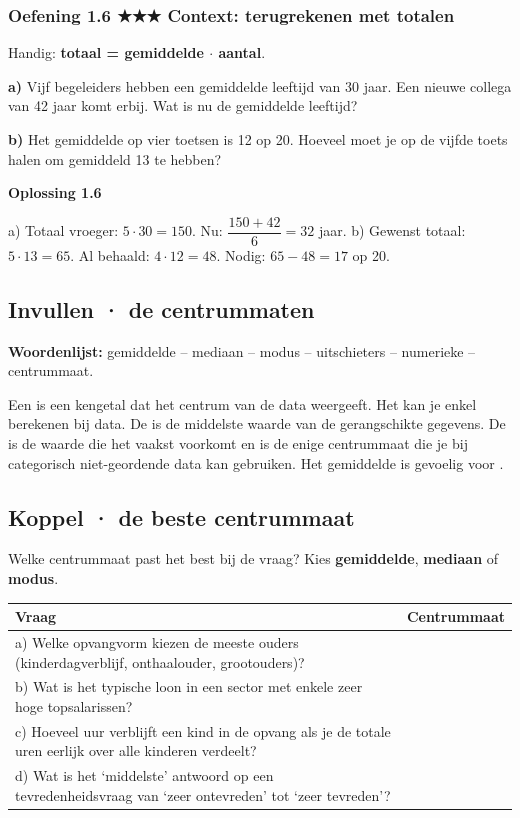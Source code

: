 \subsubsection*{Oefening 1.6 \quad ★★★ \quad Context: terugrekenen met totalen}

Handig: \textbf{totaal = gemiddelde $\cdot$ aantal}.

\textbf{a)} Vijf begeleiders hebben een gemiddelde leeftijd van 30 jaar. Een nieuwe collega van 42 jaar komt erbij. Wat is nu de gemiddelde leeftijd? \lijn

\textbf{b)} Het gemiddelde op vier toetsen is 12 op 20. Hoeveel moet je op de vijfde toets halen om gemiddeld 13 te hebben? \lijn

\begin{oplossing}
\textbf{Oplossing 1.6}

a) Totaal vroeger: $5\cdot 30=150$. Nu: $\dfrac{150+42}{6}=32$ jaar. b) Gewenst totaal: $5\cdot 13=65$. Al behaald: $4\cdot 12=48$. Nodig: $65-48=17$ op 20.
\end{oplossing}

\subsection*{Invullen · de centrummaten}

\textbf{Woordenlijst:} gemiddelde – mediaan – modus – uitschieters – numerieke – centrummaat.

Een  is een kengetal dat het centrum van de data weergeeft. Het  kan je enkel berekenen bij  data. De  is de middelste waarde van de gerangschikte gegevens. De  is de waarde die het vaakst voorkomt en is de enige centrummaat die je bij categorisch niet-geordende data kan gebruiken. Het gemiddelde is gevoelig voor .

\subsection*{Koppel · de beste centrummaat}

Welke centrummaat past het best bij de vraag? Kies \textbf{gemiddelde}, \textbf{mediaan} of \textbf{modus}.

\begin{tabular}{ll}
\hline
Vraag & Centrummaat \\
\hline
a) Welke opvangvorm kiezen de meeste ouders (kinderdagverblijf, onthaalouder, grootouders)? & \\
b) Wat is het typische loon in een sector met enkele zeer hoge topsalarissen? & \\
c) Hoeveel uur verblijft een kind in de opvang als je de totale uren eerlijk over alle kinderen verdeelt? & \\
d) Wat is het ‘middelste’ antwoord op een tevredenheidsvraag van ‘zeer ontevreden’ tot ‘zeer tevreden’? & \\
\hline
\end{tabular}

